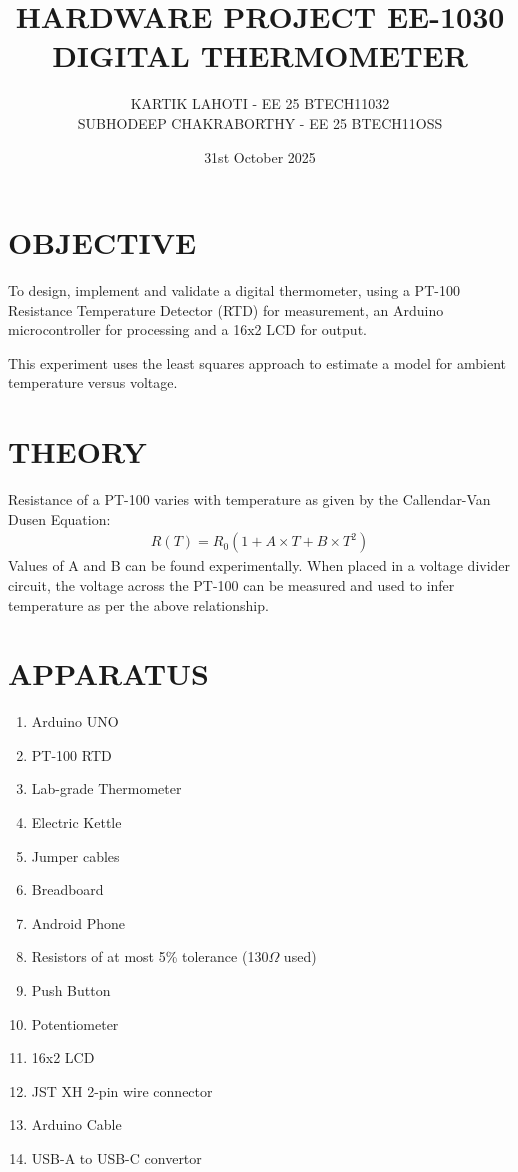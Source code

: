 \documentclass{article}
\title{HARDWARE PROJECT EE-1030 \\ DIGITAL THERMOMETER}
\author{KARTIK LAHOTI - EE 25 BTECH11032 \\ SUBHODEEP CHAKRABORTHY - EE 25 BTECH11OSS}
\date{31st October 2025}
\begin{document}
\maketitle
\tableofcontents
\newpage

\section*{OBJECTIVE}
To design, implement and validate a digital thermometer, using a PT-100 Resistance Temperature Detector (RTD) for measurement, an Arduino microcontroller for processing and a 16x2 LCD for output.

This experiment uses the least squares approach to estimate a model for ambient temperature versus voltage.

\section*{THEORY}
Resistance of a PT-100 varies with temperature as given by the Callendar-Van Dusen Equation:
\begin{align}
    R(T) = R_0(1 + A \times T + B \times T^2)
\end{align} 
Values of A and B can be found experimentally. When placed in a voltage divider circuit, the voltage across the PT-100 can be measured and used to infer temperature as per the above relationship.

\section*{APPARATUS}
\begin{enumerate}
    \item Arduino UNO
    \item PT-100 RTD
    \item Lab-grade Thermometer
    \item Electric Kettle
    \item Jumper cables
    \item Breadboard
    \item Android Phone
    \item Resistors of at most 5\% tolerance (130$\Omega$ used)
    \item Push Button
    \item Potentiometer
    \item 16x2 LCD
    \item JST XH 2-pin wire connector
    \item Arduino Cable
    \item USB-A to USB-C convertor
\end{enumerate}
\end{document}
